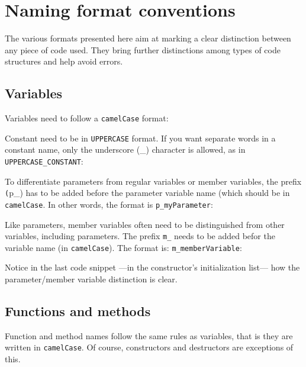 \section{Naming format conventions}

The various formats presented here aim at marking a clear distinction between 
any piece of code used. They bring further distinctions among types of code 
structures and help avoid errors.

\subsection{Variables}

Variables need to follow a \texttt{camelCase} format:


Constant need to be in \texttt{UPPERCASE} format. If you want separate words 
in a constant name, only the underscore (\_) character is allowed, as in 
\texttt{UPPERCASE\_CONSTANT}:

\newpage


To differentiate parameters from regular variables or member variables, the 
prefix \texttt(p\_) has to be added before the parameter variable name (which 
should be in \texttt{camelCase}. In other words, the format is 
\texttt{p\_myParameter}:


Like parameters, member variables often need to be distinguished from other 
variables, including parameters. The prefix \texttt{m\_} needs to be added 
befor the variable name (in \texttt{camelCase}). The format is: 
\texttt{m\_memberVariable}:


Notice in the last code snippet ---in the constructor's initialization list--- 
how the parameter/member variable distinction is clear.

\subsection{Functions and methods}
Function and method names follow the same rules as variables, that is they are 
written in \texttt{camelCase}. Of course, constructors and destructors are 
exceptions of this.

